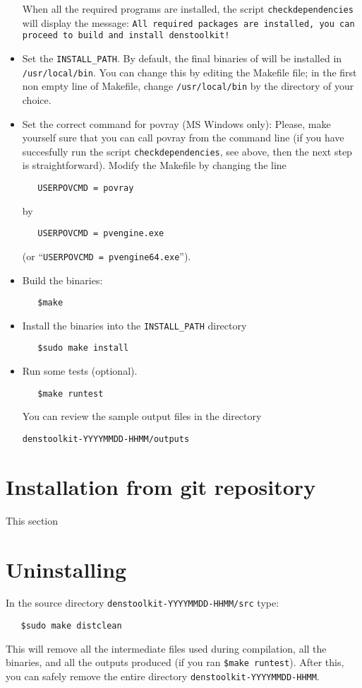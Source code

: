 \begin{itemize}
When all the required programs are installed, the script \texttt{checkdependencies} will display the message: \texttt{All required packages are installed, you can proceed to build and install denstoolkit!}
\item Set the \texttt{INSTALL\_PATH}. By default, the final binaries of \DTK{} will be installed in \texttt{/usr/local/bin}. You can change this by editing the Makefile file; in the first non empty line of Makefile, change \texttt{/usr/local/bin} by the directory of your choice.
\item Set the correct command for povray (MS Windows only): Please, make yourself sure that you can call povray from the command line (if you have succesfully run the script \texttt{checkdependencies}, see above, then the next step is straightforward). Modify the Makefile by changing the line
\begin{verbatim}
   USERPOVCMD = povray
\end{verbatim}
by
\begin{verbatim}
   USERPOVCMD = pvengine.exe
\end{verbatim}
(or ``\texttt{USERPOVCMD = pvengine64.exe}'').
\item Build the \DTK{} binaries:
\begin{verbatim}
   $make
\end{verbatim}
\item Install the binaries into the \texttt{INSTALL\_PATH} directory
\begin{verbatim}
   $sudo make install
\end{verbatim}
\item Run some tests (optional).
\begin{verbatim}
   $make runtest
\end{verbatim}
 You can review the sample output files in the directory 
 
 \texttt{denstoolkit-YYYYMMDD-HHMM/outputs}
\end{itemize}

\section{Installation from git repository}

This section 

\section{Uninstalling \DTK}

In the source directory \texttt{denstoolkit-YYYYMMDD-HHMM/src} type:
\begin{verbatim}
   $sudo make distclean
\end{verbatim}
This will remove all the intermediate files used during compilation, all the binaries, and all the outputs produced (if you ran \texttt{\$make runtest}). After this, you can safely remove the entire directory \texttt{denstoolkit-YYYYMMDD-HHMM}.









